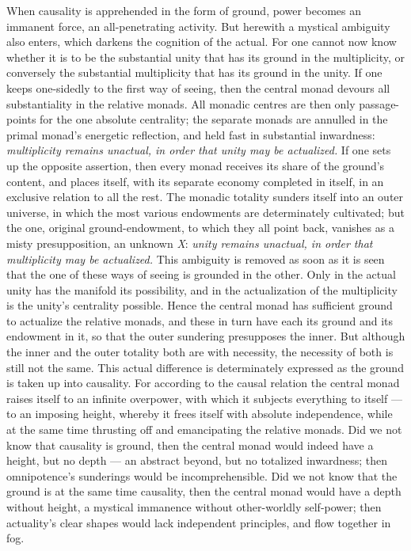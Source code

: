 \documentclass[12pt]{book}
\begin{document}
When causality is apprehended in the form of ground, power becomes an
immanent force, an all-penetrating activity. But herewith a mystical
ambiguity also enters, which darkens the cognition of the actual. For one
cannot now know whether it is to be the substantial unity that has its
ground in the multiplicity, or conversely the substantial multiplicity that
has its ground in the unity. If one keeps one-sidedly to the first way of
seeing, then the central monad devours all substantiality in the relative
monads. All monadic centres are then only passage-points for the one
absolute centrality; the separate monads are annulled in the primal monad's
energetic reflection, and held fast in substantial inwardness:
\emph{multiplicity remains unactual, in order that unity may be
actualized.} If one sets up the opposite assertion, then every monad
receives its share of the ground's content, and places itself, with its
separate economy completed in itself, in an exclusive relation to all the
rest. The monadic totality sunders itself into an outer universe, in which
the most various endowments are determinately cultivated; but the one,
original ground-endowment, to which they all point back, vanishes as a misty
presupposition, an unknown \textit{X}: \emph{unity remains unactual, in
order that multiplicity may be actualized.} This ambiguity is removed as
soon as it is seen that the one of these ways of seeing is grounded in the
other. Only in the actual unity has the manifold its possibility, and in the
actualization of the multiplicity is the unity's centrality possible. Hence
the central monad has sufficient ground to actualize the relative monads,
and these in turn have each its ground and its endowment in it, so that the
outer sundering presupposes the inner. But although the inner and the outer
totality both are with necessity, the necessity of both is still not the
same. This actual difference is determinately expressed as the ground is
taken up into causality. For according to the causal relation the central
monad raises itself to an infinite overpower, with which it subjects
everything to itself --- to an imposing height, whereby it frees itself with
absolute independence, while at the same time thrusting off and emancipating
the relative monads. Did we not know that causality is ground, then the
central monad would indeed have a height, but no depth --- an abstract
beyond, but no totalized inwardness; then omnipotence's sunderings would be
incomprehensible. Did we not know that the ground is at the same time
causality, then the central monad would have a depth without height, a
mystical immanence without other-worldly self-power; then actuality's clear
shapes would lack independent principles, and flow together in fog.
\end{document}
